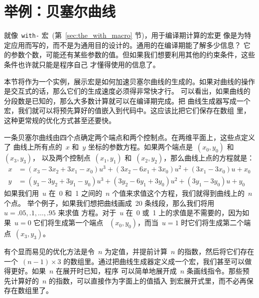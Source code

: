 \section{举例：贝塞尔曲线}
\label{sec:example_bezier_curves}

就像~\verb|with-| 宏~(第~\ref{sec:the_with_macro} 节)，用于编译期计算的宏更
像是为特定应用而写的，而不是为通用目的设计的\utility{}。通用的\utility{}在编译期能了解多少信息？
它的参数个数，可能还有某些参数的值。但如果我们想要利用其他的约束条件，这些条件也许就只能是程序自己
才懂得使用的信息了。

本节将作为一个实例，展示宏是如何加速贝塞尔曲线的生成的。如果对曲线的操作是交互式的话，那么它们的生成速度必须得非常快才行。
可以看出，如果曲线的分段数是已知的，那么大多数计算就可以在编译期完成。把
曲线生成器写成一个宏，我们就可以将预先算好的值嵌入到代码中。这应该比把它们保存在数组
里，这种更常规的优化方式甚至还要快。

一条贝塞尔曲线由四个点确定\pozhehao{}两个端点和两个控制点。在两维平面上，这些点定义了
曲线上所有点的~$x$ 和~$y$ 坐标的参数方程。如果两个端点是~$(x_0,y_0)$ 和~$(x_3,y_3)$，
以及两个控制点~$(x_1,y_1)$ 和~$(x_2,y_2)$，那么曲线上点的方程就是：
\begin{align*}
  x &= (x_3-3x_2+3x_1-x_0) u^3 + (3x_2-6x_1+3x_0) u^2 + (3x_1-3x_0) u + x_0\\
  y &= (y_3-3y_2+3y_1-y_0) u^3 + (3y_2-6y_1+3y_0) u^2 + (3y_1-3y_0) u + y_0
\end{align*}
如果我们用~$u$ 在~0 和~1 之间的~$n$ 个值来求值这个方程，我们就得到曲线上的~$n$ 个点。
举个例子，如果我们想把曲线画成~20 条线段，那么我们将用~$u=.05,.1,\ldots,.95$ 来求值
方程。对于~$u$ 在~0 或~1 上的求值是不需要的，因为如果~$u=0$ 它们将生成第一个端点
~$(x_0,y_0)$，而当~$u=1$ 时它们将生成第二个端点~$(x_3,y_3)$。

有个显而易见的优化方法是令~$n$ 为定值，并提前计算~$n$ 的指数，然后将它们存在一个~$(n-1)\times 3$
的数组里。通过把曲线生成器定义成一个宏，我们甚至可以做得更好。如果~$n$ 在展开时已知，程序
可以简单地展开成~$n$ 条画线指令。那些预先计算好的~$n$ 的指数，可以直接作为字面上的值插入
到宏展开式里，而不必再保存在数组里了。

